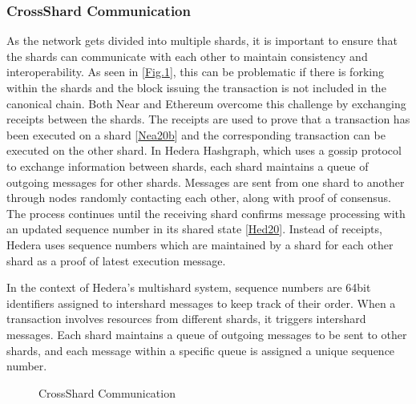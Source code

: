 \documentclass[letterpaper,10pt,english]{jupyterBook}
\let\sphinxpxdimen\pdfpxdimen\else\newdimen\sphinxpxdimen
\begin{document}
\subsubsection{Cross\sphinxhyphen{}Shard Communication}
\label{\detokenize{SHARDING/sharding:cross-shard-communication}}
\sphinxAtStartPar
As the network gets divided into multiple shards, it is important to ensure that the shards can communicate with each other to maintain consistency and interoperability. As seen in {[}\hyperref[\detokenize{SHARDING/sharding:cross-sharding}]{Fig.\@ \ref{\detokenize{SHARDING/sharding:cross-sharding}}}{]}, this can be problematic if there is forking within the shards and the block issuing the transaction is not included in the canonical chain. Both Near and Ethereum overcome this challenge by exchanging receipts between the shards. The receipts are used to prove that a transaction has been executed on a shard {[}\hyperlink{cite.SHARDING/sharding:id68}{Nea20b}{]} and the corresponding transaction can be executed on the other shard. In Hedera Hashgraph, which uses a gossip protocol to exchange information between shards, each shard maintains a queue of outgoing messages for other shards. Messages are sent from one shard to another through nodes randomly contacting each other, along with proof of consensus. The process continues until the receiving shard confirms message processing with an updated sequence number in its shared state {[}\hyperlink{cite.SHARDING/sharding:id69}{Hed20}{]}. Instead of receipts, Hedera uses sequence numbers which are maintained by a shard for each other shard as a proof of latest execution message.

\begin{sphinxShadowBox}

\sphinxAtStartPar
In the context of Hedera’s multi\sphinxhyphen{}shard system, sequence numbers are 64\sphinxhyphen{}bit identifiers assigned to inter\sphinxhyphen{}shard messages to keep track of their order. When a transaction involves resources from different shards, it triggers inter\sphinxhyphen{}shard messages. Each shard maintains a queue of outgoing messages to be sent to other shards, and each message within a specific queue is assigned a unique sequence number.
\end{sphinxShadowBox}

\begin{figure}[htbp]
\centering
\capstart

\noindent\sphinxincludegraphics[width=350\sphinxpxdimen,height=230\sphinxpxdimen]{{cross-shard}.png}
\caption{Cross\sphinxhyphen{}Shard Communication}\label{\detokenize{SHARDING/sharding:cross-sharding}}\end{figure}
\end{document}
